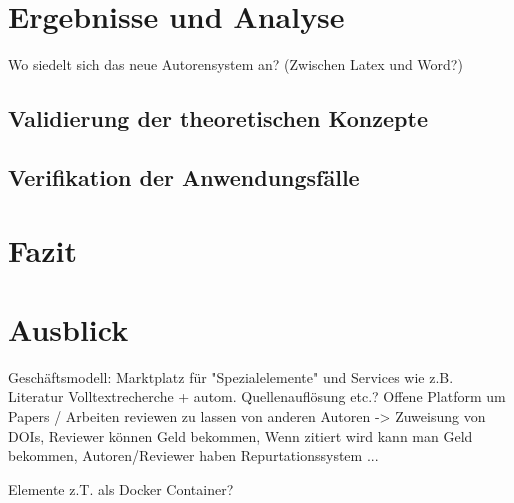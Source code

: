 \chapter{Ergebnisse und Analyse}

Wo siedelt sich das neue Autorensystem an? (Zwischen Latex und Word?)

\section{Validierung der theoretischen Konzepte}

\section{Verifikation der Anwendungsfälle}


\chapter{Fazit}


\chapter{Ausblick}

Geschäftsmodell: Marktplatz für "Spezialelemente" und Services wie z.B. Literatur Volltextrecherche + autom. Quellenauflösung etc.? Offene Platform um Papers / Arbeiten reviewen zu lassen von anderen Autoren -> Zuweisung von DOIs, Reviewer können Geld bekommen, Wenn zitiert wird kann man Geld bekommen, Autoren/Reviewer haben Repurtationssystem ...

Elemente z.T. als Docker Container?


